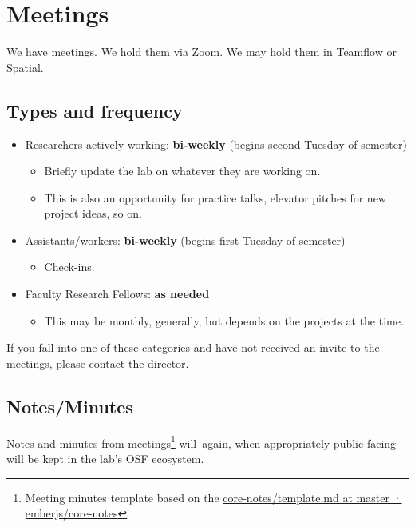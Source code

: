 \documentclass[]{tufte-book}
\providecommand{\tightlist}{%
  \setlength{\itemsep}{0pt}\setlength{\parskip}{0pt}}
\begin{document}
\hypertarget{meetings}{%
\chapter{Meetings}\label{meetings}}

We have meetings. We hold them via Zoom. We may hold them in Teamflow or Spatial.

\hypertarget{types-and-frequency}{%
\section{Types and frequency}\label{types-and-frequency}}

\begin{itemize}
\tightlist
\item
  Researchers actively working: \textbf{bi-weekly} (begins second Tuesday of semester)

  \begin{itemize}
  \tightlist
  \item
    Briefly update the lab on whatever they are working on.
  \item
    This is also an opportunity for practice talks, elevator pitches for new project ideas, so on.
  \end{itemize}
\item
  Assistants/workers: \textbf{bi-weekly} (begins first Tuesday of semester)

  \begin{itemize}
  \tightlist
  \item
    Check-ins.
  \end{itemize}
\item
  Faculty Research Fellows: \textbf{as needed}

  \begin{itemize}
  \tightlist
  \item
    This may be monthly, generally, but depends on the projects at the time.
  \end{itemize}
\end{itemize}

If you fall into one of these categories and have not received an invite to the meetings, please contact the director.

\hypertarget{notesminutes}{%
\section{Notes/Minutes}\label{notesminutes}}

Notes and minutes from meetings\footnote{Meeting minutes template based on the \href{https://github.com/emberjs/core-notes/blob/master/learning-team/template.md}{core-notes/template.md at master · emberjs/core-notes}} will--again, when appropriately public-facing--will be kept in the lab's OSF ecosystem.
\end{document}
